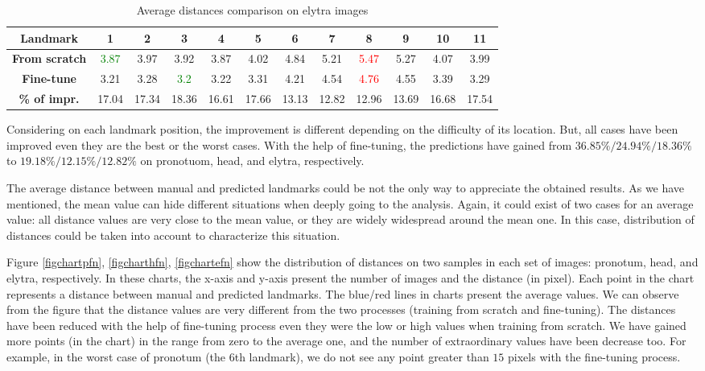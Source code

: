 \documentclass[review]{elsarticle}
\begin{document}
\begin{table}[h!]
	\centering
	\begin{tabular}{| c | c | c | c | c | c | c | c | c | c | c | c |}
		\hline
		\textbf{Landmark} & 1 & 2 & 3 & 4 & 5 & 6 & 7 & 8 & 9 & 10 & 11 \\ \hline
		\textbf{From scratch} & \textcolor{green}{3.87} & 3.97 & 3.92 & 3.87 & 4.02 & 4.84 & 5.21 & \textcolor{red}{5.47} & 5.27 & 4.07 & 3.99 \\ \hline
		\textbf{Fine-tune} & 3.21 & 3.28 & \textcolor{green}{3.2} & 3.22 & 3.31 & 4.21 & 4.54 & \textcolor{red}{4.76} & 4.55 & 3.39 & 3.29 \\ \hline
		\textbf{\% of impr.} & 17.04 & 17.34 & 18.36 & 16.61 & 17.66 & 13.13 & 12.82 & 12.96 & 13.69 & 16.68 & 17.54 \\ \hline
	\end{tabular}
	\caption{Average distances comparison on elytra images}
	\label{tblfn_elytra}
\end{table}

Considering on each landmark position, the improvement is different depending on the difficulty of its location. But, all cases have been improved even they are the best or the worst cases. With the help of fine-tuning, the predictions have gained from $36.85\%/ 24.94\%/ 18.36\%$ to $19.18\%/ 12.15\%/ 12.82\%$ on pronotuom, head, and elytra, respectively.

The average distance between manual and predicted landmarks could be not the only way to appreciate the obtained results. As we have mentioned, the mean value can hide different situations when deeply going to the analysis. Again, it could exist of two cases for an average value: all distance values are very close to the mean value, or they are widely widespread around the mean one. In this case, distribution of distances could be taken into account to characterize this situation.

Figure \ref{figchartpfn}, \ref{figcharthfn}, \ref{figchartefn} show the distribution of distances on two samples in each set of images: pronotum, head, and elytra, respectively. In these charts, the x-axis and y-axis present the number of images and the distance (in pixel). Each point in the chart represents a distance between manual and predicted landmarks. The blue/red lines in charts present the average values. We can observe from the figure that the distance values are very different from the two processes (training from scratch and fine-tuning). The distances have been reduced with the help of fine-tuning process even they were the low or high values when training from scratch. We have gained more points (in the chart) in the range from zero to the average one, and the number of extraordinary values have been decrease too. For example, in the worst case of pronotum (the 6th landmark), we do not see any point greater than $15$ pixels with the fine-tuning process.
\end{document}
